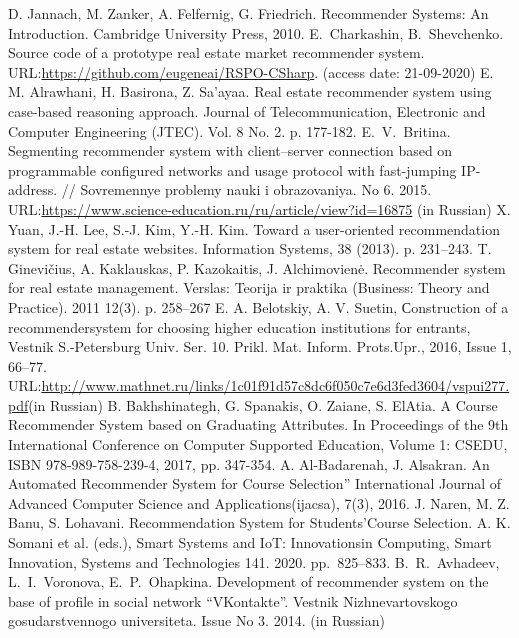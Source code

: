 \documentclass[conference]{IEEEtran}
\begin{document}
\begin{thebibliography}{99}
 D. Jannach, M. Zanker, A. Felfernig, G. Friedrich. Recommender Systems: An Introduction. Cambridge University Press, 2010.
E.~Charkashin, B.~Shevchenko. Source code of a prototype real estate market recommender system.  URL:\url{https://github.com/eugeneai/RSPO-CSharp}. (access date: 21-09-2020)
E. M. Alrawhani, H. Basirona, Z. Sa’ayaa. Real estate recommender system using case-based reasoning approach. Journal of
Telecommunication, Electronic and Computer Engineering (JTEC).
Vol. 8 No. 2. p. 177-182.
 E.~V.~Britina. Segmenting recommender system with client--server connection based on programmable configured networks and usage protocol with fast-jumping IP-address.  // Sovremennye problemy nauki i obrazovaniya. No 6. 2015.
URL:\url{https://www.science-education.ru/ru/article/view?id=16875} (in Russian)
 X. Yuan, J.-H. Lee, S.-J. Kim, Y.-H. Kim. Toward a user-oriented recommendation system for real estate websites. Information Systems, 38 (2013). p. 231–243.
T. Ginevičius, A. Kaklauskas, P. Kazokaitis, J. Alchimovienė.
Recommender system for real estate management. Verslas: Teorija ir
praktika (Business: Theory and Practice). 2011 12(3). p. 258–267 
 E. A. Belotskiy, A. V. Suetin, Сonstruction of a recommendersystem for choosing higher education institutions for entrants, Vestnik S.-Petersburg Univ. Ser. 10. Prikl. Mat. Inform. Prots.Upr., 2016, Issue 1, 66–77. URL:\url{http://www.mathnet.ru/links/1c01f91d57c8dc6f050c7e6d3fed3604/vspui277.pdf}(in Russian)
B. Bakhshinategh, G. Spanakis, O. Zaiane, S. ElAtia. A Course Recommender System based on Graduating Attributes. In Proceedings of the 9th International Conference on Computer Supported Education, Volume 1: CSEDU, ISBN 978-989-758-239-4, 2017, pp. 347-354. 
A. Al-Badarenah, J. Alsakran. An Automated Recommender System for Course Selection” International Journal of Advanced Computer Science and Applications(ijacsa), 7(3), 2016. 
J. Naren, M. Z. Banu, S. Lohavani. Recommendation System for Students’Course Selection. A. K. Somani et al. (eds.), Smart Systems and IoT: Innovationsin Computing, Smart Innovation, Systems and Technologies 141. 2020. pp.~825--833. 
 B.~R.~Avhadeev, L.~I.~Voronova, E.~P.~Ohapkina. Development of recommender system on the base of profile in social network ``VKontakte''. Vestnik Nizhnevartovskogo gosudarstvennogo universiteta. Issue No 3. 2014. (in Russian)

\end{thebibliography}
\end{document}
